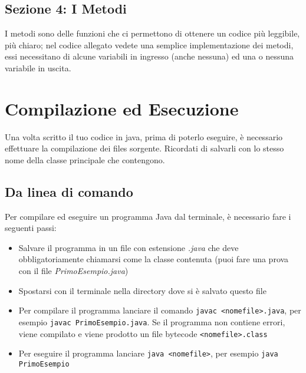 \documentclass{article}
\begin{document}
\subsection{Sezione 4: I Metodi}
    \noindent I metodi sono delle funzioni che ci permettono di ottenere un codice più leggibile, più chiaro; nel codice allegato vedete una semplice implementazione dei metodi, essi necessitano di alcune variabili in ingresso (anche nessuna) ed una o nessuna variabile in uscita.

\section{Compilazione ed Esecuzione}
\noindent Una volta scritto il tuo codice in java, prima di poterlo eseguire, è necessario effettuare la compilazione dei files sorgente. Ricordati di salvarli con lo stesso nome della classe principale che contengono.

\subsection{Da linea di comando}
Per compilare ed eseguire un programma Java dal terminale, è necessario fare i seguenti passi:
\begin{itemize}
\item Salvare il programma in un file con estensione \textit{.java} che deve obbligatoriamente chiamarsi come la classe contenuta (puoi fare una prova con il file \textit{PrimoEsempio.java})

\item Spostarsi con il terminale nella directory dove si è salvato questo file

\item Per compilare il programma lanciare il comando \texttt{javac <nomefile>.java}, per esempio \texttt{javac PrimoEsempio.java}. Se il programma non contiene errori, viene compilato e viene prodotto un file bytecode \texttt{<nomefile>.class}

\item Per eseguire il programma lanciare \texttt{java <nomefile>}, per esempio \texttt{java PrimoEsempio}
\end{itemize}
\end{document}
